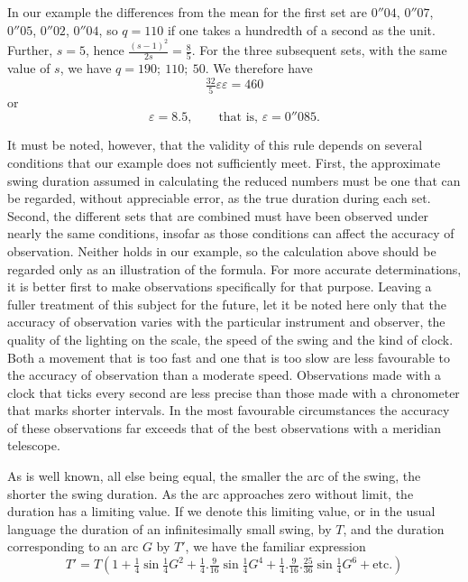 In our example the differences from the mean for the first set are $0''04$, $0''07$, $0''05$, $0''02$, $0''04$, so $q=110$ if one takes a hundredth of a second as the unit. Further, $s=5$, hence $\frac{(s-1)^2}{2s}=\frac85$. For the three subsequent sets, with the same value of $s$, we have $q=190;\ 110;\ 50$. We therefore have
\[
\tfrac{32}{5}\varepsilon\varepsilon=460
\]
or
\[
\varepsilon=8.5,\qquad\text{that is, }\varepsilon=0''085.
\]

It must be noted, however, that the validity of this rule depends on several conditions that our example does not sufficiently meet. First, the approximate swing duration assumed in calculating the reduced numbers must be one that can be regarded, without appreciable error, as the true duration during each set. Second, the different sets that are combined must have been observed under nearly the same conditions, insofar as those conditions can affect the accuracy of observation. Neither holds in our example, so the calculation above should be regarded only as an illustration of the formula. For more accurate determinations, it is better first to make observations specifically for that purpose. Leaving a fuller treatment of this subject for the future, let it be noted here only that the accuracy of observation varies with the particular instrument and observer, the quality of the lighting on the scale, the speed of the swing and the kind of clock. Both a movement that is too fast and one that is too slow are less favourable to the accuracy of
observation than a moderate speed. Observations made with a clock that ticks every second are less precise than those made with a chronometer that marks shorter intervals. In the most favourable circumstances the accuracy of these observations far exceeds that of the best observations with a meridian telescope.

As is well known, all else being equal, the smaller the arc of the swing, the shorter the swing duration. As the arc approaches zero without limit, the duration has a limiting value. If we denote this limiting value, or in the usual language the duration of an infinitesimally small swing, by $T$, and the duration corresponding to an arc $G$ by $T'$, we have the familiar expression
\[
T'=T(1+\tfrac14\sin\tfrac14G^2+\tfrac14.\tfrac9{16}\sin\tfrac14G^4+\tfrac14.\tfrac9{16}.\tfrac{25}{36}\sin\tfrac14G^6+\text{etc.})
\]

